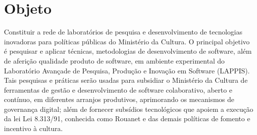 \section{Objeto}
\label{objeto}


% 

Constituir a rede de laboratórios de pesquisa e desenvolvimento de tecnologias inovadoras para políticas públicas do Ministério da Cultura.
O principal objetivo é pesquisar e aplicar técnicas, metodologias de desenvolvimento de software, além de aferição qualidade produto de software, em ambiente experimental do Laboratório Avançade de Pesquisa, Produção e Inovação em Software (LAPPIS). 
Tais pesquisas e práticas serão usadas para subsidiar o Ministério da Cultura de 
ferramentas de gestão e desenvolvimento de software colaborativo, aberto e contínuo, em diferentes arranjos produtivos, 
aprimorando os mecanismos de governança digital; além de fornecer subsídios tecnológicos que apoiem a execução da lei Lei 8.313/91,
conhecida como Rouanet e das demais políticas de fomento e incentivo à cultura.  


% 
% 
% 
% 
% 
% 
% 
